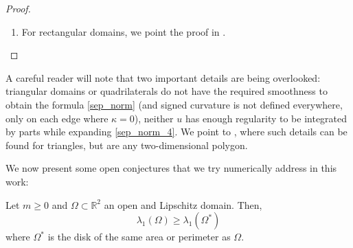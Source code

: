 \begin{proof}
\begin{enumerate}
    \item For rectangular domains, we point the proof in \cite{briet2022spectral}.
    \end{enumerate}     
\end{proof}

\begin{remark}
    A careful reader will note that two important details are being overlooked: triangular domains or quadrilaterals do not have the required smoothness to obtain the formula \eqref{sep_norm} (and signed curvature is not defined everywhere, only on each edge where \(\kappa=0\)), neither \(u\) has enough regularity to be integrated by parts while expanding \eqref{sep_norm_4}. We point to \cite{vu2023spectral}, where such details can be found for triangles, but are any two-dimensional polygon.
\end{remark}

We now present some open conjectures that we try numerically address in this work:

\begin{conjecture}
    Let \(m \geq 0\) and \(\Omega \subset \mathbb{R}^2\) an open and Lipschitz domain. Then,
    \[
    \lambda_1(\Omega) \geq \lambda_1(\Omega^\ast)
    \]
    where \(\Omega^\ast\) is the disk of the same area or perimeter as \(\Omega\).
\end{conjecture}

